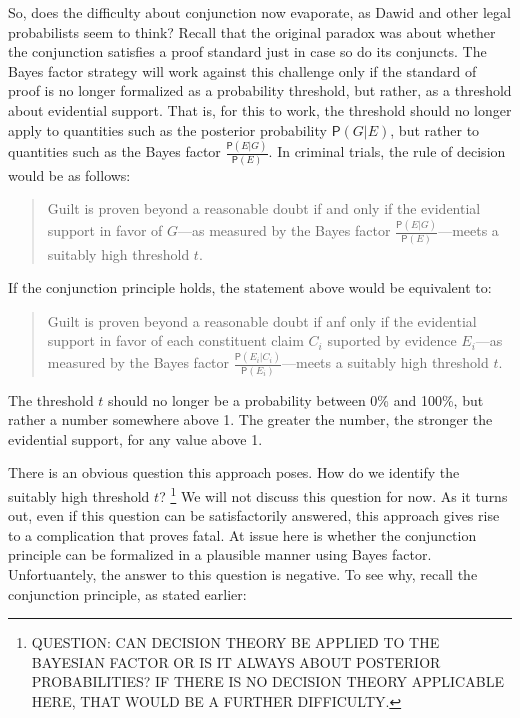 \documentclass[10pt,dvipsnames,enabledeprecatedfontcommands]{scrartcl}
\newcommand{\pr}[1]{\mathsf{P}(#1)}
\begin{document}
So, does the difficulty about conjunction now evaporate, as Dawid and
other legal probabilists  seem to
think? Recall that the original paradox was about whether the
conjunction satisfies a proof standard just in case so do its conjuncts.
The Bayes factor strategy will work against this challenge only if the
standard of proof is no longer formalized as a probability threshold,
but rather, as a threshold about evidential support. That is, for this
to work, the threshold should no longer apply to quantities such as the
posterior probability \(\pr{G | E}\), but rather to quantities such as
the Bayes factor \(\frac{\pr{E | G}}{\pr{E}}\). In criminal trials, the
rule of decision would be as follows:

\begin{quote}
 Guilt is proven beyond a reasonable doubt if and only if the evidential support in favor of  
 $G$---as measured by the Bayes factor $\frac{\pr{E | G}}{\pr{E}}$---meets a suitably high threshold $t$.  
\end{quote}

\noindent If the conjunction principle
holds,
the statement above would be equivalent
to:

\begin{quote}
Guilt is proven beyond a reasonable doubt if anf only if the evidential support in favor of each constituent claim 
 $C_i$ suported by evidence $E_i$---as measured by the Bayes factor $\frac{\pr{E_i | C_i}}{\pr{E_i}}$---meets a suitably high threshold $t$.
 \end{quote}

\noindent The threshold \(t\) should no longer be a probability between
0\% and 100\%, but rather a number somewhere above 1. The greater the
number, the stronger the evidential support, for any value above 1.

There is an obvious question this approach poses. How do we identify the
suitably high threshold
\(t\)?
\footnote{QUESTION: CAN DECISION THEORY BE APPLIED TO THE BAYESIAN FACTOR OR IS IT ALWAYS ABOUT POSTERIOR PROBABILITIES? IF THERE IS NO DECISION THEORY APPLICABLE HERE, THAT WOULD BE A FURTHER DIFFICULTY.}
We will not discuss this question for now. As it turns out, even if this
question can be satisfactorily answered, this approach gives rise to a
complication that proves fatal. At issue here is whether the conjunction
principle can be formalized in a plausible manner using Bayes factor.
Unfortuantely, the answer to this question is negative. To see why,
recall the conjunction principle, as stated earlier:
\end{document}
